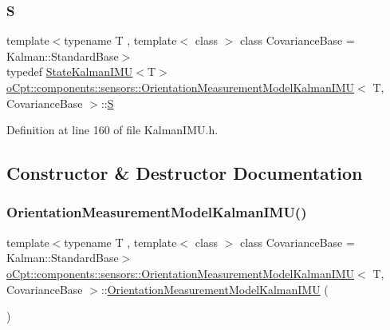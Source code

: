 \subsubsection{\texorpdfstring{S}{S}}
{\footnotesize\ttfamily template$<$typename T , template$<$ class $>$ class Covariance\+Base = Kalman\+::\+Standard\+Base$>$ \\
typedef \hyperlink{classo_cpt_1_1components_1_1sensors_1_1_state_kalman_i_m_u}{State\+Kalman\+I\+MU}$<$T$>$ \hyperlink{classo_cpt_1_1components_1_1sensors_1_1_orientation_measurement_model_kalman_i_m_u}{o\+Cpt\+::components\+::sensors\+::\+Orientation\+Measurement\+Model\+Kalman\+I\+MU}$<$ T, Covariance\+Base $>$\+::\hyperlink{classo_cpt_1_1components_1_1sensors_1_1_orientation_measurement_model_kalman_i_m_u_a3104263971226357108cef704d272f90}{S}}



Definition at line 160 of file Kalman\+I\+M\+U.\+h.



\subsection{Constructor \& Destructor Documentation}
\hypertarget{classo_cpt_1_1components_1_1sensors_1_1_orientation_measurement_model_kalman_i_m_u_ac1eccbf84f5f25954cdadcb1a5e474b1}{}\label{classo_cpt_1_1components_1_1sensors_1_1_orientation_measurement_model_kalman_i_m_u_ac1eccbf84f5f25954cdadcb1a5e474b1} 
\subsubsection{\texorpdfstring{Orientation\+Measurement\+Model\+Kalman\+I\+M\+U()}{OrientationMeasurementModelKalmanIMU()}}
{\footnotesize\ttfamily template$<$typename T , template$<$ class $>$ class Covariance\+Base = Kalman\+::\+Standard\+Base$>$ \\
\hyperlink{classo_cpt_1_1components_1_1sensors_1_1_orientation_measurement_model_kalman_i_m_u}{o\+Cpt\+::components\+::sensors\+::\+Orientation\+Measurement\+Model\+Kalman\+I\+MU}$<$ T, Covariance\+Base $>$\+::\hyperlink{classo_cpt_1_1components_1_1sensors_1_1_orientation_measurement_model_kalman_i_m_u}{Orientation\+Measurement\+Model\+Kalman\+I\+MU} (\begin{DoxyParamCaption}{ }\end{DoxyParamCaption})\hspace{0.3cm}{\ttfamily [inline]}}



